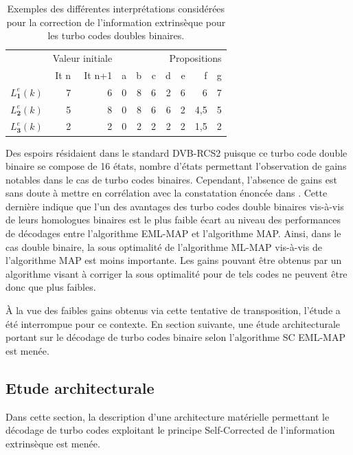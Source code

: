 \begin{table}[t]
	\centering
	\begin{tabular}{lrrrrrrrrr}
		\toprule
			&\multicolumn{2}{l}{Valeur initiale} & \multicolumn{7}{r}{Propositions} \\
			\cmidrule(r){2-3} \cmidrule(r){4-10} 
		   & It n & It n+1 & a & b & c & d &e &f &g\\ 
		 \cmidrule(r){2-2} \cmidrule(r){3-3} \cmidrule(l){4-10} 
		$L^e_\mathbf{1}(k)$& 7 & 6 & 0 & 8 & 6 & 2 & 6 & 6  & 7 \\
		$L^e_\mathbf{2}(k)$& 5 & 8 & 0 & 8 & 6 & 6 & 2 & 4,5 & 5 \\
		$L^e_\mathbf{3}(k)$& 2 & 2 & 0 & 2 & 2 & 2 & 2 & 1,5 & 2 \\
		\bottomrule
	\end{tabular}
	\caption{Exemples des différentes interprétations considérées pour la correction de l'information extrinsèque pour les turbo codes doubles binaires.}
	\label{tab:exsc}
\end{table}

Des espoirs résidaient dans le standard DVB-RCS2 puisque ce turbo code double binaire se compose de 16 états, nombre 
d'états permettant l'observation de gains notables dans le cas de turbo codes binaires. Cependant, l'absence de gains 
est sans doute à mettre en corrélation avec la constatation énoncée dans \cite{doublebinadvantages}. Cette dernière
indique que l'un des avantages des turbo codes double binaires vis-à-vis de leurs homologues binaires est le plus faible 
écart au niveau des performances de décodages entre l’algorithme EML-MAP et l'algorithme MAP. Ainsi, dans le cas double 
binaire, la sous optimalité de l'algorithme ML-MAP vis-à-vis de l'algorithme MAP 
est moins importante. Les gains pouvant être obtenus par un algorithme visant à corriger la sous optimalité pour de tels 
codes ne peuvent être donc que plus faibles.

À la vue des faibles gains obtenus via cette tentative de transposition, l'étude a été interrompue
pour ce contexte. En section suivante, une étude architecturale portant sur le décodage de turbo codes binaire selon 
l'algorithme SC EML-MAP est menée.

\subsection{Etude architecturale}
Dans cette section, la description d'une architecture matérielle permettant le décodage de turbo codes exploitant le principe 
Self-Corrected de l'information extrinsèque est menée. 

